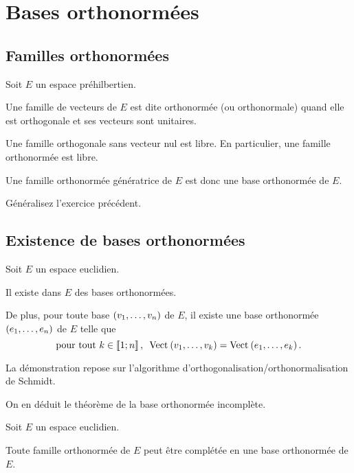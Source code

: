 \section{Bases orthonormées}

\subsection{Familles orthonormées}

\begin{defi}
Soit \(E\) un espace préhilbertien.

Une famille de vecteurs de \(E\) est dite orthonormée (ou orthonormale) quand elle est orthogonale et ses vecteurs sont unitaires.
\end{defi}

\begin{prop}
Une famille orthogonale sans vecteur nul est libre. En particulier, une famille orthonormée est libre.

Une famille orthonormée génératrice de \(E\) est donc une base orthonormée de \(E\).
\end{prop}

\begin{exo}
Généralisez l'exercice précédent.
\end{exo}

\subsection{Existence de bases orthonormées}

\begin{theo}
Soit \(E\) un espace euclidien.

Il existe dans \(E\) des bases orthonormées.

De plus, pour toute base \(\left(v_1,\dots,v_n\right)\) de \(E\), il existe une base orthonormée \(\left(e_1,\dots,e_n\right)\) de \(E\) telle que \[\quantifs{\tpt k\in\interventierii{1}{n}}\Vect{v_1,\dots,v_k}=\Vect{e_1,\dots,e_k}.\]
\end{theo}

La démonstration repose sur l'algorithme d'orthogonalisation/orthonormalisation de Schmidt.

On en déduit le théorème de la base orthonormée incomplète.

\begin{theo}
Soit \(E\) un espace euclidien.

Toute famille orthonormée de \(E\) peut être complétée en une base orthonormée de \(E\).
\end{theo}


